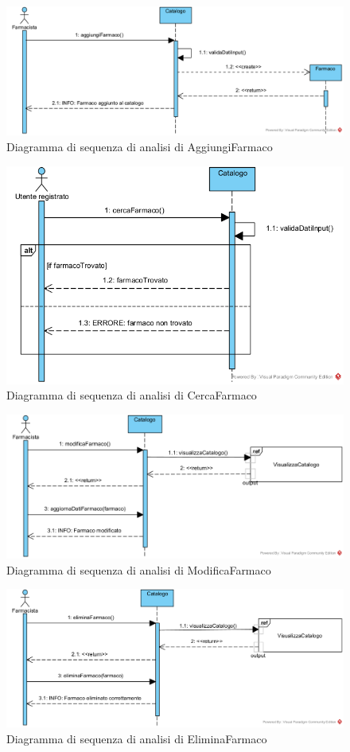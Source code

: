 \begin{figure}[!hbp]
	\centering
	\includegraphics[width=\linewidth]{assets/sequence_analisi/AggiungiFarmaco.png}
	\caption{Diagramma di sequenza di analisi di AggiungiFarmaco}
\end{figure}

\begin{figure}[!hbp]
	\centering
	\includegraphics[width=0.7\linewidth]{assets/sequence_analisi/CercaFarmaco.png}
	\caption{Diagramma di sequenza di analisi di CercaFarmaco}
\end{figure}

\begin{figure}[!hbp]
	\centering
	\includegraphics[width=0.8\linewidth]{assets/sequence_analisi/ModificaFarmaco.png}
	\caption{Diagramma di sequenza di analisi di ModificaFarmaco}
\end{figure}

\begin{figure}[!hbp]
	\centering
	\includegraphics[width=0.8\linewidth]{assets/sequence_analisi/EliminaFarmaco.png}
	\caption{Diagramma di sequenza di analisi di EliminaFarmaco}
\end{figure}

